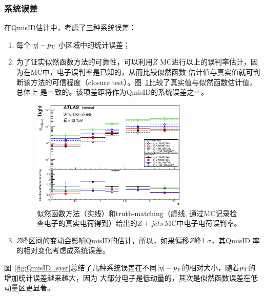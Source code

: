 \subsubsection{系统误差}
在QmisID估计中，考虑了三种系统误差：
\begin{enumerate}
 \item 每个$|\eta|-p_{\text{T}}$ 小区域中的统计误差；
 \item 为了证实似然函数方法的可靠性，可以利用$Z$ MC进行以上的误判率估计，因为在MC中，电子误判率是已知的，从而比较似然函数
估计值与真实值就可判断该方法的可信程度（closure test）。图~\ref{fig:QmisID_TMLik}比较了真实值与似然函数估计值，总体上
是一致的。该项差距将作为QmisID的系统误差之一。
\begin{figure}[h]
\centering
 \includegraphics[width=0.70\textwidth]{fig/QmisID/TMLik_tight.eps}
 \caption{似然函数方法（实线）和truth-matching（虚线, 通过MC记录检查电子的真实电荷得到）给出的$Z+jets~$MC中电子电荷误判率。}
\label{fig:QmisID_TMLik}
\end{figure}

 \item $Z$峰区间的变动会影响QmisID的估计，所以，如果偏移$Z$峰1 $\sigma$，其QmisID 率的相对变化考虑成系统误差。
\end{enumerate}
图~\ref{fig:QmisID_syst}总结了几种系统误差在不同$|\eta|-p_{\text{T}}$的相对大小，随着$p_{\text{T}}$的增加统计误差越来越大，因为
大部分电子是低动量的，其次是似然函数误差在低动量区更显著。
